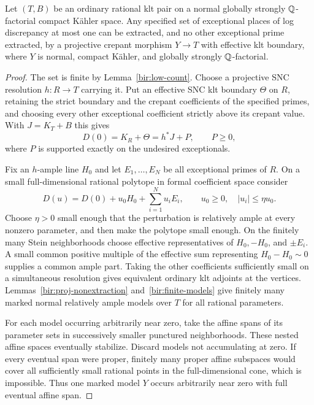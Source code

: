 \begin{proposition}
\label{bir:low-extraction}
Let $(T,B)$ be an ordinary rational klt pair on a normal globally
strongly $\mathbb{Q}$-factorial compact K\"ahler space.  Any specified set of
exceptional places of log discrepancy at most one can be extracted,
and no other exceptional prime extracted, by a projective crepant
morphism $Y\to T$ with effective klt boundary, where $Y$ is normal,
compact K\"ahler, and globally strongly $\mathbb{Q}$-factorial.
\end{proposition}

\begin{proof}
The set is finite by Lemma~\ref{bir:low-count}.  Choose a projective
SNC resolution $h:R\to T$ carrying it.  Put an effective SNC klt
boundary $\Theta$ on $R$, retaining the strict boundary and the
crepant coefficients of the specified primes, and choosing every
other exceptional coefficient strictly above its crepant value.
With $J=K_T+B$ this gives
\begin{equation}
 D(0)=K_R+\Theta=h^*J+P,\qquad P\geq0,
 \label{bir:extraction-origin}
\end{equation}
where $P$ is supported exactly on the undesired exceptionals.

Fix an $h$-ample line $H_0$ and let $E_1,\ldots,E_N$ be all
exceptional primes of $R$.  On a small full-dimensional rational
polytope in formal coefficient space consider
\begin{equation}
 D(u)=D(0)+u_0H_0+\sum_{i=1}^{N}u_iE_i,
 \qquad u_0\geq0,\quad |u_i|\leq\eta u_0.
 \label{bir:extraction-polytope}
\end{equation}
Choose $\eta>0$ small enough that the perturbation is relatively ample
at every nonzero parameter, and then make the polytope small enough.
On the finitely many Stein neighborhoods choose effective
representatives of $H_0,-H_0$, and $\pm E_i$.  A small common positive
multiple of the effective sum representing $H_0-H_0\sim0$ supplies a
common ample part.  Taking the other coefficients sufficiently small
on a simultaneous resolution gives equivalent ordinary klt adjoints
at the vertices.  Lemmas~\ref{bir:proj-nonextraction}
and~\ref{bir:finite-models} give finitely many marked normal relatively
ample models over $T$ for all rational parameters.

For each model occurring arbitrarily near zero, take the affine spans
of its parameter sets in successively smaller punctured
neighborhoods.  These nested affine spaces eventually stabilize.
Discard models not accumulating at zero.  If every eventual span
were proper, finitely many proper affine subspaces would cover all
sufficiently small rational points in the full-dimensional cone,
which is impossible.  Thus one marked model $Y$ occurs arbitrarily
near zero with full eventual affine span.


\end{proof}
